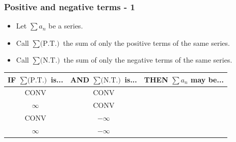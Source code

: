 \begin{frame}[t]
	\fontsize{13}{13}\selectfont
	\frametitle{Positive and negative terms - 1}

	\begin{itemize}
		\item Let $\displaystyle \sum a_{n}$ be a series.

		\item Call $\displaystyle \sum \text{(P.T.)}$ the sum of only the positive terms
			of the same series.

		\item Call $\displaystyle \sum \text{(N.T.)}$ the sum of only the negative terms
			of the same series.
	\end{itemize}


	\begin{center}
		\begin{tabular}{c|c|c}
			{\color{blue} IF $\displaystyle \sum \text{(P.T.)}$ is...} & {\color{blue} AND $\displaystyle \sum \text{(N.T.)}$ is...} & {\color{blue} THEN $\displaystyle \sum a_{n}$ may be...} \\
			\hline
			CONV                                                       & CONV                                                        & \phantom{$\displaystyle \frac{1}{1}$}                    \\
			\hline
			$\infty$                                                   & CONV                                                        & \phantom{$\displaystyle \frac{1}{1}$}                    \\
			\hline
			CONV                                                       & $-\infty$                                                   & \phantom{$\displaystyle \frac{1}{1}$}                    \\
			\hline
			$\infty$                                                   & $-\infty$                                                   & \phantom{$\displaystyle \frac{1}{1}$}                    \\
			\hline
		\end{tabular}
	\end{center}
\end{frame}

